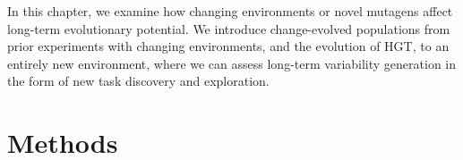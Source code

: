 \documentclass[PhD]{msu-thesis}
\begin{document}
In this chapter, we examine how changing environments or novel mutagens
affect long-term evolutionary potential. We introduce change-evolved populations from prior experiments with changing environments, and the evolution of HGT,
to an entirely new environment, where we can assess long-term variability generation in the form of new task discovery and exploration.

\section{Methods}
\end{document}
